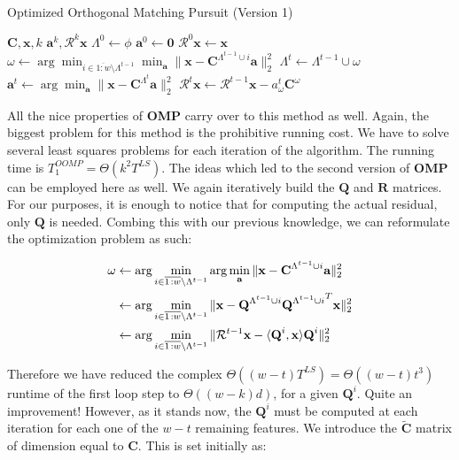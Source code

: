 \documentclass[12pt,a4paper,oneside,english]{UPBThesis}
\newcommand{\hcrange}[2]{\overline{{#1}\colon\!\!{#2}}}
\begin{document}
\begin{algorithm}
\caption{Optimized Orthogonal Matching Pursuit (Version 1)}
\label{algo:OptimizedOrthogonalMatchingPursuitMethodV1}
\begin{algorithmic}
\Require $\textbf{C},\textbf{x},k$
\Ensure $\textbf{a}^k,\mathcal{R}^k\textbf{x}$
\State $\Lambda^0 \gets \phi$
\State $\textbf{a}^0 \gets \textbf{0}$
\State $\mathcal{R}^0\textbf{x} \gets \textbf{x}$
\For {$t = \hcrange{1}{k}$}
\State $\omega \gets \arg \min_{i \in \hcrange{1}{w} \setminus \Lambda^{t-1}} \min_{\textbf{a}} {\| \textbf{x} - \textbf{C}^{\Lambda^{t-1} \cup i}\textbf{a} \|_2^2}$
\State $\Lambda^t \gets \Lambda^{t-1} \cup \omega$
\State $\textbf{a}^t \gets \arg\min_{\textbf{a}} {\| \textbf{x} - \textbf{C}^{\Lambda^t}\textbf{a} \|_2^2}$
\State $\mathcal{R}^t\textbf{x} \gets \mathcal{R}^{t-1}\textbf{x} - a_\omega^t\textbf{C}^\omega$
\EndFor
\end{algorithmic}
\end{algorithm}

All the nice properties of \textbf{OMP} carry over to this method as well. Again, the biggest problem for this method is the prohibitive running cost. We have to solve several least squares problems for each iteration of the algorithm. The running time is $T_1^{OOMP} = \Theta(k^2T^{LS})$. The ideas which led to the second version of \textbf{OMP} can be employed here as well. We again iteratively build the $\textbf{Q}$ and $\textbf{R}$ matrices. For our purposes, it is enough to notice that for computing the actual residual, only $\textbf{Q}$ is needed. Combing this with our previous knowledge, we can reformulate the optimization problem as such:

\begin{align*}
\omega & \gets \arg\min_{i \in \hcrange{1}{w} \setminus \Lambda^{t-1}} \arg\min_\textbf{a} \| \textbf{x} - \textbf{C}^{\Lambda^{t-1} \cup i}\textbf{a} \|_2^2 \\
& \gets \arg\min_{i \in \hcrange{1}{w} \setminus \Lambda^{t-1}} \| \textbf{x} - \textbf{Q}^{\Lambda^{t-1} \cup i}{\textbf{Q}^{\Lambda^{t-1} \cup i}}^T\textbf{x} \|_2^2 \\
& \gets \arg\min_{i \in \hcrange{1}{w} \setminus \Lambda^{t-1}} \| \mathcal{R}^{t-1}\textbf{x} - \langle \textbf{Q}^i, \textbf x \rangle \textbf{Q}^i \|_2^2
\end{align*}

Therefore we have reduced the complex $\Theta((w - t)T^{LS}) = \Theta((w - t)t^3)$ runtime of the first loop step to $\Theta((w - k)d)$, for a given $\textbf{Q}^i$. Quite an improvement! However, as it stands now, the $\textbf{Q}^i$ must be computed at each iteration for each one of the $w - t$ remaining features. We introduce the $\tilde{\textbf{C}}$ matrix of dimension equal to $\textbf{C}$. This is set initially as:
\end{document}
